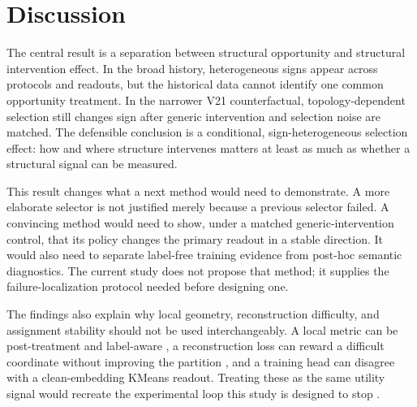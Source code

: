 \section{Discussion}

The central result is a separation between structural opportunity and structural
intervention effect. In the broad history, heterogeneous signs appear across
protocols and readouts, but the historical data cannot identify one common
opportunity treatment. In the narrower V21 counterfactual, topology-dependent
selection still changes sign after generic intervention and selection noise are
matched. The defensible conclusion is a conditional, sign-heterogeneous
selection effect: how and where structure intervenes matters at least as much
as whether a structural signal can be measured.

This result changes what a next method would need to demonstrate. A more
elaborate selector is not justified merely because a previous selector failed.
A convincing method would need to show, under a matched generic-intervention
control, that its policy changes the primary readout in a stable direction. It
would also need to separate label-free training evidence from post-hoc semantic
diagnostics. The current study does not propose that method; it supplies the
failure-localization protocol needed before designing one.

The findings also explain why local geometry, reconstruction difficulty, and
assignment stability should not be used interchangeably. A local metric can be
post-treatment and label-aware \citep{li2025dcboost}, a reconstruction loss can
reward a difficult coordinate without improving the partition
\citep{yan2026scmib}, and a training head can disagree with a clean-embedding
KMeans readout. Treating these as the same utility signal would recreate the
experimental loop this study is designed to stop \citep{li2025lfss}.
